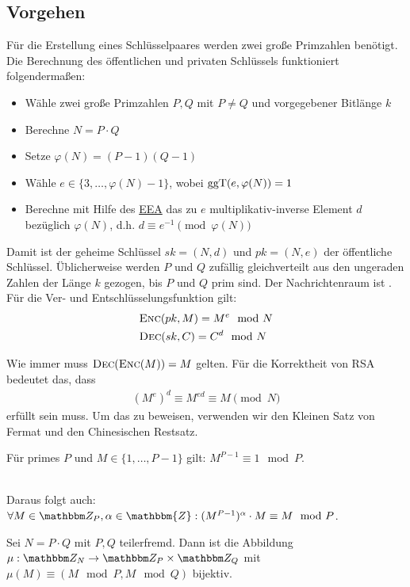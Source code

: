 \subsection{Vorgehen}
\label{ch:asymmenc:rsa:vorgehen}
Für die Erstellung eines Schlüsselpaares werden zwei große Primzahlen benötigt. Die Berechnung des öffentlichen und privaten Schlüssels funktioniert
folgendermaßen:
\begin{itemize}
 	\item Wähle zwei große Primzahlen $P, Q$ mit $P \neq Q$ und vorgegebener Bitlänge $k$
 	\item Berechne $N = P \cdot Q$
 	\item Setze $\varphi(N) = (P - 1)(Q - 1)$
 	\item Wähle $e \in \{3, \dotsc, \varphi(N) - 1\}$, wobei $\operatorname{ggT}(e, \varphi(N)) = 1$
 	\item Berechne mit Hilfe des \hyperref[ssec:eea]{EEA} das zu $e$ multiplikativ-inverse Element $d$ bezüglich $\varphi(N)$, d.h. $d \equiv e^{-1} \pmod{\varphi(N)}$
 \end{itemize}

Damit ist der geheime Schlüssel $sk = (N, d)$ und $pk = (N, e)$ der öffentliche Schlüssel. Üblicherweise werden $P$ und $Q$ zufällig gleichverteilt aus den ungeraden Zahlen der Länge $k$ gezogen,
bis $P$ und $Q$ prim sind. Der Nachrichtenraum ist . Für die Ver- und Entschlüsselungsfunktion gilt:
\begin{align*}
	& \textsc{Enc}(pk, M) = M^e \mod N\\
	& \textsc{Dec}(sk, C) = C^d \mod N
\end{align*}

Wie immer muss $\textsc{Dec}(\textsc{Enc}(M)) = M$ gelten. Für die Korrektheit von RSA bedeutet das, dass 
\begin{align*}
	(M^e)^d \equiv M^{ed} \equiv M \pmod N
\end{align*}
erfüllt sein muss. Um das zu beweisen, verwenden wir den Kleinen Satz von Fermat und den Chinesischen Restsatz.

\vspace{10pt}
\begin{theorem}
Für primes $P$ und $M \in \{1, \dotsc, P-1\}$ gilt: $M^{P-1} \equiv 1 \mod P$.
\end{theorem}

~\\
Daraus folgt auch: $\forall M \in \Z P, \alpha \in \mathbbm{Z} : (M^{P-1})^{\alpha} \cdot M \equiv M \mod P$.

\vspace{10pt}
\begin{theorem}
Sei $N = P \cdot Q$ mit $P, Q$ teilerfremd. Dann ist die Abbildung $\mu : \Z N \rightarrow \Z P \times \Z Q$ mit $\mu(M) \equiv (M \mod P, M \mod Q)$ bijektiv.
\end{theorem}

